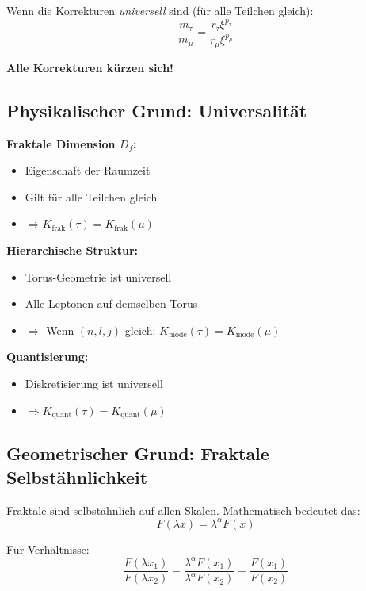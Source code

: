 Wenn die Korrekturen \textit{universell} sind (für alle Teilchen gleich):
\begin{equation}
	\frac{m_\tau}{m_\mu} = \frac{r_\tau \xi^{p_\tau}}{r_\mu \xi^{p_\mu}}
\end{equation}

\textbf{Alle Korrekturen kürzen sich!}

\subsection{Physikalischer Grund: Universalität}

\textbf{Fraktale Dimension $D_f$:}
\begin{itemize}[nosep]
	\item Eigenschaft der Raumzeit
	\item Gilt für alle Teilchen gleich
	\item $\Rightarrow K_\text{frak}(\tau) = K_\text{frak}(\mu)$
\end{itemize}

\textbf{Hierarchische Struktur:}
\begin{itemize}[nosep]
	\item Torus-Geometrie ist universell
	\item Alle Leptonen auf demselben Torus
	\item $\Rightarrow$ Wenn $(n,l,j)$ gleich: $K_\text{mode}(\tau) = K_\text{mode}(\mu)$
\end{itemize}

\textbf{Quantisierung:}
\begin{itemize}[nosep]
	\item Diskretisierung ist universell
	\item $\Rightarrow K_\text{quant}(\tau) = K_\text{quant}(\mu)$
\end{itemize}

\subsection{Geometrischer Grund: Fraktale Selbstähnlichkeit}

Fraktale sind selbstähnlich auf allen Skalen. Mathematisch bedeutet das:
\begin{equation}
	F(\lambda x) = \lambda^\alpha F(x)
\end{equation}

Für Verhältnisse:
\begin{equation}
	\frac{F(\lambda x_1)}{F(\lambda x_2)} = \frac{\lambda^\alpha F(x_1)}{\lambda^\alpha F(x_2)} = \frac{F(x_1)}{F(x_2)}
\end{equation}

